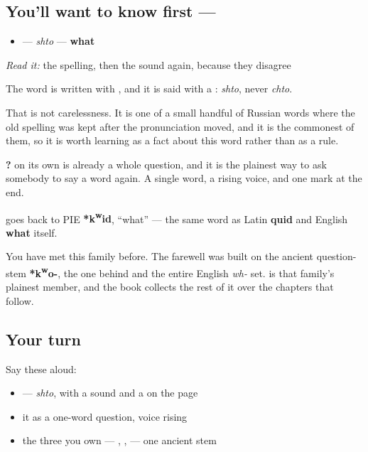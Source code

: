 \subsection*{You'll want to know first — }
\begin{itemize}
\raggedright
  \item \textbf{} — \emph{shto} — \textbf{what}
\end{itemize}

\emph{Read it:} the spelling, then the sound again, because they disagree

The word is written with \textbf{}, and it is said with a \textbf{}: \emph{shto}, never \emph{chto}.

That is not carelessness. It is one of a small handful of Russian words where the old spelling was kept after the pronunciation moved, and it is the commonest of them, so it is worth learning as a fact about this word rather than as a rule.

\textbf{?} on its own is already a whole question, and it is the plainest way to ask somebody to say a word again. A single word, a rising voice, and one mark at the end.

\begin{cousinweb}
\textbf{} goes back to PIE \textbf{*k\textsuperscript{w}id}, \textquotedblleft{}what\textquotedblright{} — the same word as Latin \textbf{quid} and English \textbf{what} itself.

You have met this family before. The farewell \textbf{} was built on the ancient question-stem \textbf{*k\textsuperscript{w}o-}, the one behind \textbf{} and the entire English \emph{wh-} set. \textbf{} is that family's plainest member, and the book collects the rest of it over the chapters that follow.
\end{cousinweb}

\subsection*{Your turn}
Say these aloud:

\begin{itemize}
\raggedright
  \item \emph{} — \emph{shto}, with a \textbf{} sound and a \textbf{} on the page
  \item it as a one-word question, voice rising
  \item the three you own — \emph{}, \emph{}, \emph{} — one ancient stem
\end{itemize}

